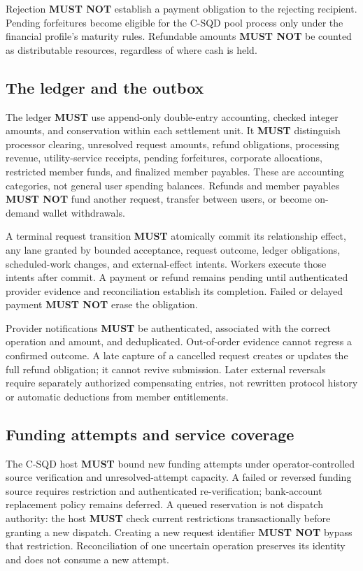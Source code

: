 \documentclass[11pt]{article}
\newcommand{\MUST}{\textbf{MUST}}
\newcommand{\MUSTNOT}{\textbf{MUST NOT}}
\begin{document}
Rejection \MUSTNOT{} establish a payment obligation to the rejecting recipient.
Pending forfeitures become eligible for the C-SQD pool process only under the
financial profile's maturity rules. Refundable amounts \MUSTNOT{} be counted
as distributable resources, regardless of where cash is held.

\subsection{The ledger and the outbox}

The ledger \MUST{} use append-only double-entry accounting, checked integer
amounts, and conservation within each settlement unit. It \MUST{} distinguish
processor clearing, unresolved request amounts, refund obligations, processing
revenue, utility-service receipts, pending forfeitures, corporate allocations, restricted member funds,
and finalized member payables. These are accounting categories, not general
user spending balances. Refunds and member payables \MUSTNOT{} fund another
request, transfer between users, or become on-demand wallet withdrawals.

A terminal request transition \MUST{} atomically commit its relationship effect,
any lane granted by bounded acceptance,
request outcome, ledger obligations, scheduled-work changes, and external-effect
intents. Workers execute those intents after commit. A payment or refund remains
pending until authenticated provider evidence and reconciliation establish its
completion. Failed or delayed payment \MUSTNOT{} erase the obligation.

Provider notifications \MUST{} be authenticated, associated with the correct
operation and amount, and deduplicated. Out-of-order evidence cannot regress a
confirmed outcome. A late capture of a cancelled request creates or updates the
full refund obligation; it cannot revive submission. Later external reversals
require separately authorized compensating entries, not rewritten protocol
history or automatic deductions from member entitlements.

\subsection{Funding attempts and service coverage}

The C-SQD host \MUST{} bound new funding attempts under operator-controlled
source verification and unresolved-attempt capacity. A failed or reversed funding
source requires restriction and authenticated re-verification; bank-account
replacement policy remains deferred. A queued reservation is not dispatch
authority: the host \MUST{} check current restrictions transactionally before
granting a new dispatch. Creating a
new request identifier \MUSTNOT{} bypass that restriction. Reconciliation of one
uncertain operation preserves its identity and does not consume a new attempt.
\end{document}
